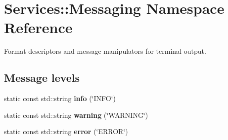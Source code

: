 \hypertarget{namespaceServices_1_1Messaging}{
\section{Services::Messaging Namespace Reference}
\label{namespaceServices_1_1Messaging}
}
Format descriptors and message manipulators for terminal output.  


\subsection*{Message levels}
\begin{CompactItemize}
\item 
\hypertarget{namespaceServices_1_1Messaging_e13e4a6ffbf393c9a92124096c4f76e5}{
static const std::string \textbf{info} (\char`\"{}INFO\char`\"{})}
\label{namespaceServices_1_1Messaging_e13e4a6ffbf393c9a92124096c4f76e5}

\item 
\hypertarget{namespaceServices_1_1Messaging_ebd0fd82dac53b2c7d15e540a4396a9a}{
static const std::string \textbf{warning} (\char`\"{}WARNING\char`\"{})}
\label{namespaceServices_1_1Messaging_ebd0fd82dac53b2c7d15e540a4396a9a}

\item 
\hypertarget{namespaceServices_1_1Messaging_7d85644729ac76933c427565474476df}{
static const std::string \textbf{error} (\char`\"{}ERROR\char`\"{})}
\label{namespaceServices_1_1Messaging_7d85644729ac76933c427565474476df}

\end{CompactItemize}
